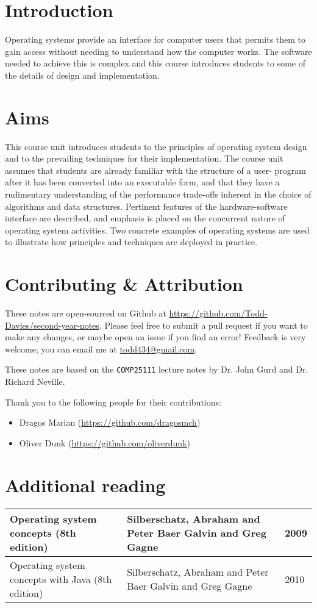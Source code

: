 \section*{Introduction}

Operating systems provide an interface for computer users that permits them to
gain access without needing to understand how the computer works. The software
needed to achieve this is complex and this course introduces students to some of
the details of design and implementation.

\section*{Aims}

This course unit introduces students to the principles of operating system
design and to the prevailing techniques for their implementation. The course
unit assumes that students are already familiar with the structure of a user-
program after it has been converted into an executable form, and that they have
a rudimentary understanding of the performance trade-offs inherent in the choice
of algorithms and data structures. Pertinent features of the hardware-software
interface are described, and emphasis is placed on the concurrent nature of
operating system activities. Two concrete examples of operating systems are used
to illustrate how principles and techniques are deployed in practice.

\section*{Contributing \& Attribution}

These notes are open-sourced on Github at
\url{https://github.com/Todd-Davies/second-year-notes}. Please feel free to
submit a pull request if you want to make any changes, or maybe open an issue
if you find an error! Feedback is very welcome; you can email me at
\href{mailto:todd434@gmail.com}{todd434@gmail.com}.

These notes are based on the \texttt{COMP25111} lecture notes by Dr. John Gurd
and Dr. Richard Neville.

Thank you to the following people for their contributions:
\begin{itemize}
  \item Dragos Marian (\url{https://github.com/dragosmch})
  \item Oliver Dunk (\url{https://github.com/oliverdunk})
\end{itemize}

\section*{Additional reading}

\begin{tabularx}{\textwidth}{X|X|l}
  Operating system concepts (8th edition) & Silberschatz, Abraham and Peter Baer Galvin and Greg Gagne & 2009\\ \hline
  Operating system concepts with Java (8th edition) & Silberschatz, Abraham and Peter Baer Galvin and Greg Gagne & 2010
\end{tabularx}